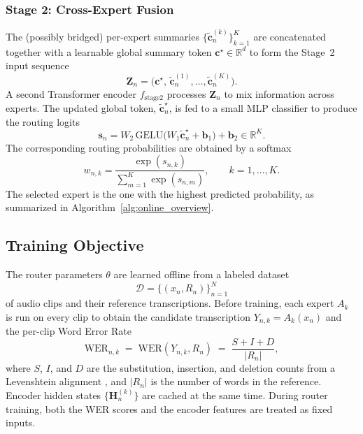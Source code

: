 \documentclass[journal]{IEEEtran}
\begin{document}
\subsubsection{Stage 2: Cross-Expert Fusion}

The (possibly bridged) per-expert summaries
$\bigl\{\widetilde{\mathbf{c}}_n^{(k)}\bigr\}_{k=1}^{K}$ are
concatenated together with a learnable global summary token
$\mathbf{c}^{\star}\in\mathbb{R}^{d}$ to form the Stage~2 input
sequence
\[
\mathbf{Z}_n =
\bigl(\mathbf{c}^{\star},\,
\widetilde{\mathbf{c}}_n^{(1)},\dots,\widetilde{\mathbf{c}}_n^{(K)}\bigr).
\]
A second Transformer encoder $f_{\text{stage2}}$ processes
$\mathbf{Z}_n$ to mix information across experts. The updated global
token, $\widetilde{\mathbf{c}}^{\star}_n$, is fed to a small MLP
classifier to produce the routing logits
\begin{equation}
\mathbf{s}_n =
W_2\,\mathrm{GELU}\bigl(W_1\widetilde{\mathbf{c}}^{\star}_n
+\mathbf{b}_1\bigr) + \mathbf{b}_2 \in \mathbb{R}^{K}.
\label{eq:logits}
\end{equation}
The corresponding routing probabilities are obtained by a softmax
\begin{equation}
w_{n,k} =
\frac{\exp(s_{n,k})}{\sum_{m=1}^{K}\exp(s_{n,m})},
\qquad k=1,\dots,K.
\label{eq:router_softmax}
\end{equation}
The selected expert is the one with the highest predicted
probability, as summarized in Algorithm~\ref{alg:online_overview}.

\subsection{Training Objective}
\label{subsec:training_objective}

The router parameters $\theta$ are learned offline from a labeled
dataset
\[
\mathcal{D}=\{(x_n,R_n)\}_{n=1}^{N}
\]
of audio clips and their reference transcriptions. Before training,
each expert $A_k$ is run on every clip to obtain the candidate
transcription $Y_{n,k}=A_k(x_n)$ and the per-clip Word Error Rate
\[
\mathrm{WER}_{n,k} \;=\; \mathrm{WER}(Y_{n,k},R_n)
\;=\; \frac{S+I+D}{|R_n|},
\]
where $S$, $I$, and $D$ are the substitution, insertion, and deletion
counts from a Levenshtein alignment \cite{li2014overviewrobust}, and
$|R_n|$ is the number of words in the reference. Encoder hidden
states $\{\mathbf{H}_n^{(k)}\}$ are cached at the same time. During
router training, both the WER scores and the encoder features are
treated as fixed inputs.
\end{document}
